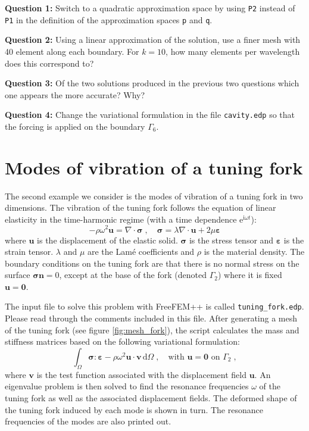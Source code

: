 \documentclass[english,3p]{elsarticle}
\newcommand{\code}[1]{\texttt{#1}}
\newcommand{\ii}{\mathrm{i}}
\newcommand{\ee}{\mathrm{e}}
\newcommand{\dd}{\mathrm{d}}
\begin{document}
\textbf{Question 1:} Switch to a quadratic approximation space by using \code{P2} instead of \code{P1} in the definition of the approximation spaces \code{p} and \code{q}.

\textbf{Question 2:} Using a linear approximation of the solution, use a finer mesh with 40 element along each boundary.
For $k=10$, how many elements per wavelength does this correspond to?

\textbf{Question 3:} Of the two solutions produced in the previous two questions which one appears the more accurate? Why?

\textbf{Question 4:} Change the variational formulation in the file \code{cavity.edp} so that the forcing is applied on the boundary $\Gamma_6$.


\section{Modes of vibration of a tuning fork}

The second example we consider is the modes of vibration of a tuning fork in two dimensions.
The vibration of the tuning fork follows the equation of linear elasticity in the time-harmonic regime (with a time dependence $\ee^{\ii\omega t}$):
\begin{equation}
-\rho\omega^2\mathbf{u} = \nabla\cdot\boldsymbol{\sigma}
\;,\quad
\boldsymbol{\sigma} = \lambda\nabla\cdot\mathbf{u} + 2\mu\boldsymbol{\varepsilon}
\label{eq:elasticity}
\end{equation}
where $\mathbf{u}$ is the displacement of the elastic solid.
$\boldsymbol{\sigma}$ is the stress tensor and $\boldsymbol{\varepsilon}$ is the strain tensor.
$\lambda$ and $\mu$ are the Lamé coefficients and $\rho$ is the material density.
The boundary conditions on the tuning fork are that there is no normal stress on the surface $\boldsymbol{\sigma}\mathbf{n} = 0$, except at the base of the fork (denoted $\Gamma_2$) where it is fixed $\mathbf{u}=\mathbf{0}$.

The input file to solve this problem with FreeFEM++ is called \code{tuning\_fork.edp}.
Please read through the comments included in this file.
After generating a mesh of the tuning fork (see figure \ref{fig:mesh_fork}), the script calculates the mass and stiffness matrices based on the following variational formulation:
$$
\int_\Omega \boldsymbol{\sigma}:\boldsymbol{\varepsilon} - \rho\omega^2\mathbf{u}\cdot\mathbf{v}\,\dd\Omega
\;,\quad
\text{with } \mathbf{u}=\mathbf{0} \text{ on } \Gamma_2
\;,
$$
where $\mathbf{v}$ is the test function associated with the displacement field $\mathbf{u}$.
An eigenvalue problem is then solved to find the resonance frequencies $\omega$ of the tuning fork as well as the associated displacement fields.
The deformed shape of the tuning fork induced by each mode is shown in turn.
The resonance frequencies of the modes are also printed out.
\end{document}

